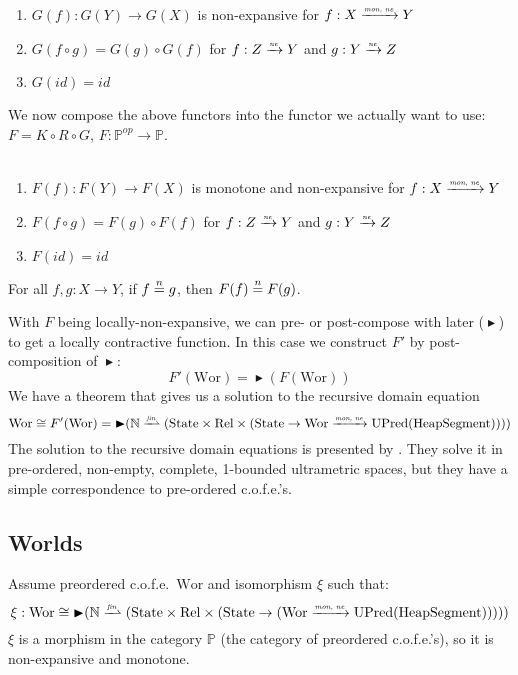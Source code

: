 \documentclass[a4paper]{article}
\newcommand{\forcenewline}{$\phantom{v}$\\}
\newcommand{\finparfun}{\xrightharpoonup{\textit{\tiny{fin}}}}
\newcommand{\monnefun}{\xrightarrow{\textit{\tiny{mon, ne}}}}
\newcommand{\nefun}{\xrightarrow{\textit{\tiny{ne}}}}
\newcommand{\fun}{\rightarrow}
\newcommand{\nequal}[1][n]{\stackrel{\tiny{#1}}{=}}
\newcommand{\blater}{\mathop{\blacktriangleright}}
\newcommand{\id}{\var{id}}
\newcommand{\cofe}{c.o.f.e.}
\newcommand{\cofes}{\cofe{}'s}
\newcommand{\CatP}{\mathbb{P}}
\newcommand{\var}[1]{\mathit{#1}}
\newcommand{\plaindom}[1]{\mathrm{#1}}
\newcommand{\HeapSegments}{\plaindom{HeapSegment}}
\newcommand{\nats}{\mathbb{N}}
\newcommand{\Rel}{\plaindom{Rel}}
\newcommand{\States}{\plaindom{State}}
\newcommand{\Wor}{\plaindom{Wor}}
\newcommand{\UPred}[1]{\plaindom{UPred}(#1)}
\begin{document}
\begin{lemma}[$G$ functorial]\forcenewline
\label{lem:G-func}
  \begin{enumerate}
  \item $G(f) : G(Y) \rightarrow G(X)$ is non-expansive for $f : X \monnefun Y$
  \item $G(f \circ g) = G(g) \circ G(f)$ for $f : Z \nefun Y$ and $g : Y \nefun Z$
  \item $G(\id) = \id$
  \end{enumerate}
\end{lemma}
We now compose the above functors into the functor we actually want to use: $F = K \circ R \circ G$, $F : \CatP^{\var{op}} \rightarrow \CatP$.
\begin{lemma}[$F$ functorial]\forcenewline
\label{lem:F-func}
  \begin{enumerate}
  \item $F(f) : F(Y) \rightarrow F(X)$ is monotone and non-expansive for $f : X \monnefun Y$
  \item $F(f \circ g) = F(g) \circ F(f)$ for $f : Z \nefun Y$ and $g : Y \nefun Z$\
  \item $F(\id) = \id$
  \end{enumerate}
\end{lemma}

\begin{lemma}
\label{lem:F-loc-ne}
For all $f, g : X \fun Y$, if $f \nequal g$, then $F(f) \nequal F(g)$.
\end{lemma}
With $F$ being locally-non-expansive, we can pre- or post-compose with later ($\blater$) to get a locally contractive function. In this case we construct $F'$ by post-composition of $\blater$:
\[
  F'(\Wor) = \blater (F(\Wor))
\]
We have a theorem that gives us a solution to the recursive domain equation
\[
  \Wor \cong F'(\Wor) = \blater (\nats \finparfun (\States \times \Rel \times (\States \fun \Wor \monnefun \UPred{\HeapSegments} )))
\]
The solution to the recursive domain equations is presented by \cite{Birkedal:2010:TCS:411:4102-4122}. They solve it in pre-ordered, non-empty, complete, 1-bounded ultrametric spaces, but they have a simple correspondence to pre-ordered \cofes{}.

\subsection{Worlds}
\label{subsec:worlds}
Assume preordered \cofe{}\ $\Wor$ and isomorphism $\xi$ such that:
\[
  \xi : \Wor \cong \blater (\nats \finparfun (\States \times \Rel \times (\States \fun (\Wor \monnefun \UPred{\HeapSegments}))))
\]
$\xi$ is a morphism in the category $\CatP$ (the category of preordered \cofes{}), so it is non-expansive and monotone.
\end{document}
